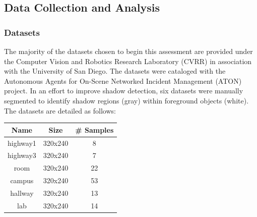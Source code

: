\documentclass[12pt]{report}
\begin{document}
\subsection{Data Collection and Analysis}  \label{section:datacollection}
\subsubsection{Datasets}
The majority of the datasets chosen to begin this assessment are provided under the Computer Vision and Robotics Research Laboratory (CVRR) in association with the University of San Diego. The datasets were cataloged with the Autonomous Agents for On-Scene Networked Incident Management (ATON) project. In an effort to improve shadow detection, six datasets were manually segmented to identify shadow regions (gray) within foreground objects (white). The datasets are detailed as follows:

\begin{center}
\begin{tabular}{ |c|c|c| }
	\hline
	\textbf{Name} & \textbf{Size} & \textbf{\# Samples} \\
	\hline
	\hline
	highway1 & 320x240 & 8 \\
	\hline 
	highway3 & 320x240 & 7 \\ 
	\hline
	room & 320x240 & 22 \\ 
	\hline
	campus & 320x240 & 53 \\ 
	\hline
	hallway & 320x240 & 13 \\
	\hline
	lab & 320x240 & 14 \\ 
	\hline
\end{tabular}
\end{center}
\end{document}
